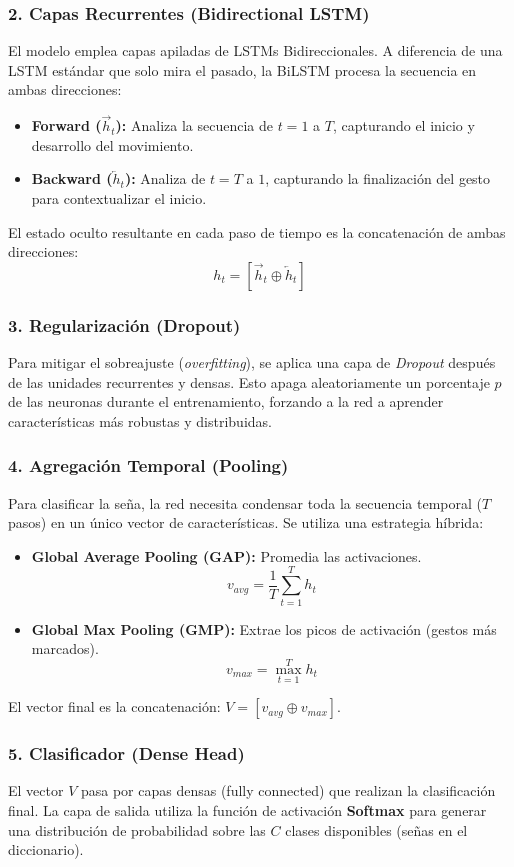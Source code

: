 \subsubsection{2. Capas Recurrentes (Bidirectional LSTM)}
El modelo emplea capas apiladas de LSTMs Bidireccionales. A diferencia de una LSTM estándar que solo mira el pasado, la BiLSTM procesa la secuencia en ambas direcciones:
\begin{itemize}
    \item \textbf{Forward ($\vec{h}_t$):} Analiza la secuencia de $t=1$ a $T$, capturando el inicio y desarrollo del movimiento.
    \item \textbf{Backward ($\overleftarrow{h}_t$):} Analiza de $t=T$ a $1$, capturando la finalización del gesto para contextualizar el inicio.
\end{itemize}
El estado oculto resultante en cada paso de tiempo es la concatenación de ambas direcciones:
\[ h_t = [\vec{h}_t \oplus \overleftarrow{h}_t] \]

\subsubsection{3. Regularización (Dropout)}
Para mitigar el sobreajuste (\textit{overfitting}), se aplica una capa de \textit{Dropout} después de las unidades recurrentes y densas. Esto apaga aleatoriamente un porcentaje $p$ de las neuronas durante el entrenamiento, forzando a la red a aprender características más robustas y distribuidas.

\subsubsection{4. Agregación Temporal (Pooling)}
Para clasificar la seña, la red necesita condensar toda la secuencia temporal ($T$ pasos) en un único vector de características. Se utiliza una estrategia híbrida:
\begin{itemize}
    \item \textbf{Global Average Pooling (GAP):} Promedia las activaciones.
    \[ v_{avg} = \frac{1}{T} \sum_{t=1}^{T} h_t \]
    \item \textbf{Global Max Pooling (GMP):} Extrae los picos de activación (gestos más marcados).
    \[ v_{max} = \max\limits_{t=1}^{T} h_t \]
\end{itemize}
El vector final es la concatenación: $V = [v_{avg} \oplus v_{max}]$.

\subsubsection{5. Clasificador (Dense Head)}
El vector $V$ pasa por capas densas (fully connected) que realizan la clasificación final. La capa de salida utiliza la función de activación \textbf{Softmax} para generar una distribución de probabilidad sobre las $C$ clases disponibles (señas en el diccionario).

